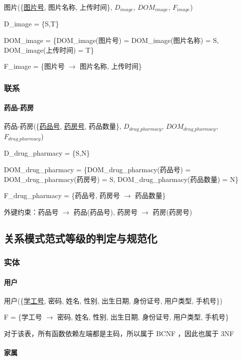 \documentclass{article}
\begin{document}
图片(\{\underline{图片号}, 图片名称, 上传时间\}, $D_{image}$, $DOM_{image}$, $F_{image}$)

D\_image = \{S,T\}

DOM\_image = \{DOM\_image(图片号) = DOM\_image(图片名称) = S, DOM\_image(上传时间) = T\}

F\_image = \{图片号 $\rightarrow$ 图片名称, 上传时间\}

\subsubsection{联系}

\paragraph{药品-药房}

药品-药房(\{\underline{药品号}, \underline{药房号}, 药品数量\}, $D_{drug\_pharmacy}$, $DOM_{drug\_pharmacy}$, $F_{drug\_pharmacy}$)

D\_drug\_pharmacy = \{S,N\}

DOM\_drug\_pharmacy = \{DOM\_drug\_pharmacy(药品号) = DOM\_drug\_pharmacy(药房号) = S, \newline DOM\_drug\_pharmacy(药品数量) = N\}

F\_drug\_pharmacy = \{药品号, 药房号 $\rightarrow$ 药品数量\}

外键约束：药品号 $\rightarrow$ 药品(药品号), 药房号 $\rightarrow$ 药房(药房号)

\subsection{关系模式范式等级的判定与规范化}

\subsubsection{实体}

\paragraph{用户}

用户(\{\underline{学工号}, 密码, 姓名, 性别, 出生日期, 身份证号, 用户类型, 手机号\})

F = \{学工号 $\rightarrow$ 密码, 姓名, 性别, 出生日期, 身份证号, 用户类型, 手机号\}

对于该表，所有函数依赖左端都是主码，所以属于 BCNF ，因此也属于 3NF 

\paragraph{家属}
\end{document}
